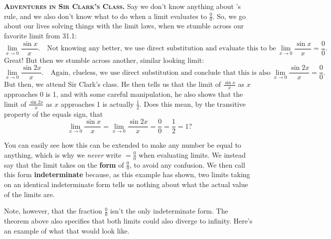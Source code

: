 \begin{center}
    \colorbox{Periwinkle!30}{\begin{minipage}{0.97\textwidth}
        \textbf{\scshape{Adventures in Sir Clark's Class.}} Say we don't know anything about \lh's rule, and we also don't know what to do when a limit evaluates to \(\frac{0}{0}\). So, we go about our lives solving things 
        with the limit laws, when we stumble across our favorite limit from 31.1:\[
            \lim_{x\to 0} \frac{\sin x}{x}.\quad\text{Not knowing any better, we use direct substitution and evaluate this to be}~\lim_{x\to 0} \frac{\sin x}{x} = \frac{0}{0}.
        \] Great! But then we stumble across another, similar looking limit:\[
            \lim_{x\to 0} \frac{\sin 2x}{x}.\quad\text{Again, clueless, we use direct substitution and conclude that this is also}~ \lim_{x\to 0} \frac{\sin 2x}{x} = \frac{0}{0}.
        \] But then, we attend Sir Clark's class. He then tells us 
        that the limit of \(\frac{\sin x}{x}\) as \(x\) approaches 0 is 1, and with some careful manipulation, he also shows that the limit of \(\frac{\sin 2x}{x}\) as \(x\) approaches 1
        is actually \(\frac{1}{2}\). Does this mean, by the transitive property of the equals sign, that\[
            \lim_{x\to 0} \frac{\sin x}{x} =\lim_{x\to 0} \frac{\sin 2x}{x} = \frac{0}{0} = \frac{1}{2} = 1? 
        \] 
    \end{minipage}}
\end{center}
You can easily see how this can be extended to make any number be equal to anything, which is why we \textit{never} write \(= \frac{0}{0}\) when evaluating limits. We instead 
say that the limit takes on the \textbf{form} of \(\frac{0}{0}\), to avoid any confusion. We then call this form \textbf{indeterminate} because, as this example has shown, 
two limits taking on an identical indeterminate form tells us nothing about what the actual value of the limits are.\par
Note, however, that the fraction \(\frac{0}{0}\) isn't the only indeterminate form. The theorem above also specifies that both limits could also diverge to infinity. Here's an example of what that
would look like. 
